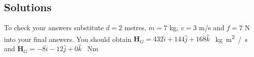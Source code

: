 \subsection*{Solutions}
To check your answers substitute $d=2$ metres, $m=7$ kg, $v=3$ m/s and $f=7$ N into your final answers.
You should obtain
$\bm{H}_G = 432 \hat{i} + 144 \hat{j} + 168 \hat{k}$ \SI{}{kg m^2 /s}
and
$\dot{\bm{H}}_G = -8 \hat{i} - 12 \hat{j} + 0 \hat{k}$ \SI{}{Nm}




%
%
%
%
%
%
%




%
%
%
%
%




